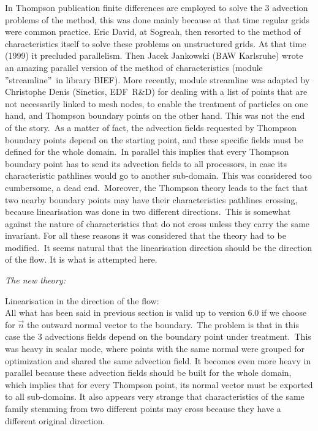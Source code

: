 In Thompson publication finite differences are employed to solve the 3
advection problems of the method, this was done mainly because at that time
regular grids were common practice. Eric David, at Sogreah, then resorted to
the method of characteristics itself to solve these problems on unstructured
grids. At that time (1999) it precluded parallelism. Then Jacek Jankowski
(BAW Karlsruhe) wrote an amazing parallel version of the method of
characteristics (module \textquotedblright streamline\textquotedblright\ in
library BIEF). More recently, module streamline was adapted by Christophe
Denis (Sinetics, EDF\ R\&D) for dealing with a list of points that are not
necessarily linked to mesh nodes, to enable the treatment of particles on
one hand, and Thompson boundary points on the other hand. This was not the
end of the story.\ As a matter of fact, the advection fields requested by
Thompson boundary points depend on the starting point, and these specific
fields must be defined for the whole domain.\ In parallel this implies that
every Thompson boundary point has to send its advection fields to all
processors, in case its characteristic pathlines would go to another
sub-domain. This was considered too cumbersome, a dead end.\ Moreover, the
Thompson theory leads to the fact that two nearby boundary points may have
their characteristics pathlines crossing, because linearisation was done in
two different directions.\ This is somewhat against the nature of
characteristics that do not cross unless they carry the same invariant. For
all these reasons it was considered that the theory had to be modified.\ It
seems natural that the linearisation direction should be the direction of
the flow. It is what is attempted here. \smallskip

\textit{The new theory:} \\ \smallskip

Linearisation in the direction of the flow: \\

All what has been said in previous section is valid up to version 6.0 if we
choose for $\vec{n}$ the outward normal vector to the boundary.\
The problem is that in this case the 3 advections fields depend on the
boundary point under treatment.\ This was heavy in scalar mode, where points
with the same normal were grouped for optimization and shared the same
advection field. It becomes even more heavy in parallel because these
advection fields should be built for the whole domain, which implies that
for every Thompson point, its normal vector must be exported to all
sub-domains. It also appears very strange that characteristics of the same
family stemming from two different points may cross because they have a
different original direction.

